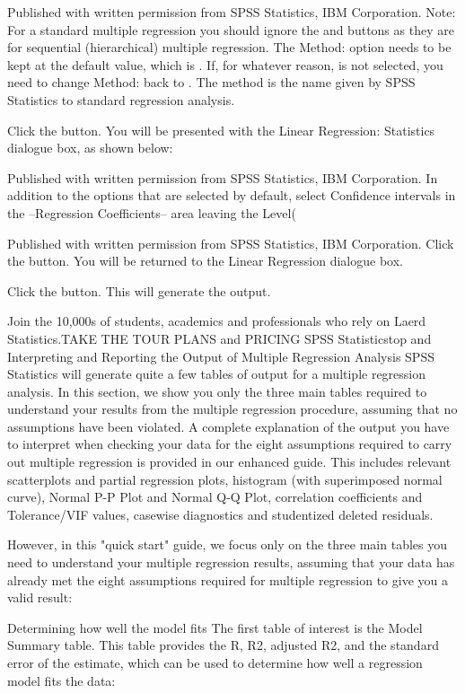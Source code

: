 \documentclass[]{article}
\begin{document}
	
	Published with written permission from SPSS Statistics, IBM Corporation.
	Note: For a standard multiple regression you should ignore the  and  buttons as they are for sequential (hierarchical) multiple regression. The Method: option needs to be kept at the default value, which is . If, for whatever reason,  is not selected, you need to change Method: back to . The  method is the name given by SPSS Statistics to standard regression analysis.
	
	Click the  button. You will be presented with the Linear Regression: Statistics dialogue box, as shown below:
	
	
	Published with written permission from SPSS Statistics, IBM Corporation.
	In addition to the options that are selected by default, select Confidence intervals in the –Regression Coefficients– area leaving the Level(%
	
	
	Published with written permission from SPSS Statistics, IBM Corporation.
	Click the  button. You will be returned to the Linear Regression dialogue box.
	
	Click the  button. This will generate the output.
	
	Join the 10,000s of students, academics and professionals who rely on Laerd Statistics.TAKE THE TOUR PLANS and PRICING
	SPSS Statisticstop and
	Interpreting and Reporting the Output of Multiple Regression Analysis
	SPSS Statistics will generate quite a few tables of output for a multiple regression analysis. In this section, we show you only the three main tables required to understand your results from the multiple regression procedure, assuming that no assumptions have been violated. A complete explanation of the output you have to interpret when checking your data for the eight assumptions required to carry out multiple regression is provided in our enhanced guide. This includes relevant scatterplots and partial regression plots, histogram (with superimposed normal curve), Normal P-P Plot and Normal Q-Q Plot, correlation coefficients and Tolerance/VIF values, casewise diagnostics and studentized deleted residuals.
	
	However, in this "quick start" guide, we focus only on the three main tables you need to understand your multiple regression results, assuming that your data has already met the eight assumptions required for multiple regression to give you a valid result:
	
	Determining how well the model fits
	The first table of interest is the Model Summary table. This table provides the R, R2, adjusted R2, and the standard error of the estimate, which can be used to determine how well a regression model fits the data:
	
\end{document}
